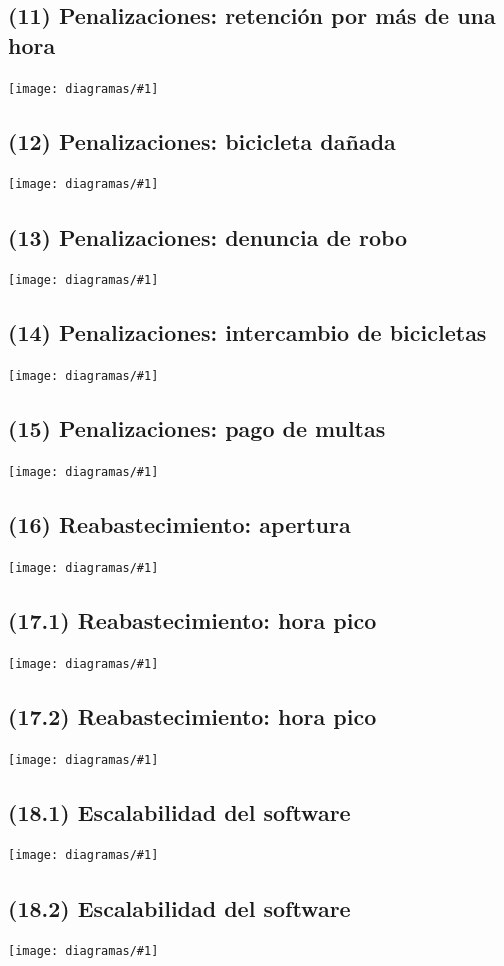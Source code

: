 \documentclass[a4paper, 10pt, twoside]{article}
\newcommand{\diagramah}[1]{
  \texttt{[image: diagramas/\#1]}
}
\begin{document}
\subsection{(11)   Penalizaciones: retención por más de una hora}
\diagramah{objetivos-11}

\subsection{(12)   Penalizaciones: bicicleta dañada}
\diagramah{objetivos-12}

\subsection{(13)   Penalizaciones: denuncia de robo}
\diagramah{objetivos-13}

\subsection{(14)   Penalizaciones: intercambio de bicicletas}
\diagramah{objetivos-14}

\subsection{(15)   Penalizaciones: pago de multas}
\diagramah{objetivos-15}

\subsection{(16)   Reabastecimiento: apertura}
\diagramah{objetivos-16}

\subsection{(17.1) Reabastecimiento: hora pico}
\diagramah{objetivos-17.1}

\subsection{(17.2) Reabastecimiento: hora pico}
\diagramah{objetivos-17.2}

\subsection{(18.1) Escalabilidad del software}
\diagramah{objetivos-18.1}

\subsection{(18.2) Escalabilidad del software}
\diagramah{objetivos-18.2}
\end{document}
